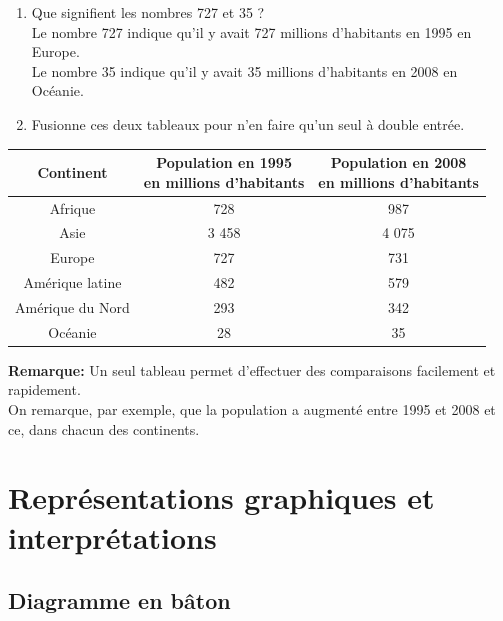\documentclass[12pt,a4paper]{article}
\begin{document}
\begin{enumerate}[label=\textbf{\alph*.}]
\item Que signifient les nombres 727 et 35 ? \\
Le nombre  727  indique qu'il y avait 727 millions d'habitants en 1995 en Europe.\\
Le nombre  35  indique qu'il y avait 35 millions d'habitants en 2008 en Océanie.
\item Fusionne ces deux tableaux pour n'en faire qu'un seul à double entrée.
\end{enumerate}

\begin{minipage}{0.7\textwidth}
\begin{tabular}{|c|c|c|}
\hline \rowcolor{lightgray}
Continent & \thead{Population en 1995\\en millions d'habitants}& \thead{Population en 2008\\en millions d'habitants} \\ \hline
Afrique & 728 & 987 \\ \hline
Asie & 3 458 & 4 075 \\ \hline
Europe & 727 & 731 \\ \hline
Amérique latine & 482 & 579 \\ \hline
Amérique du Nord & 293 & 342 \\ \hline
Océanie & 28 & 35 \\ \hline
\end{tabular}
\end{minipage}
\begin{minipage}{0.3\textwidth}
\textbf{Remarque:} Un seul tableau permet d'effectuer des comparaisons facilement et rapidement. \\
On remarque, par exemple, que la population a augmenté entre 1995 et 2008 et ce, dans chacun des continents.
\end{minipage}

\section{Représentations graphiques et interprétations}

\subsection{Diagramme en bâton}
\end{document}

